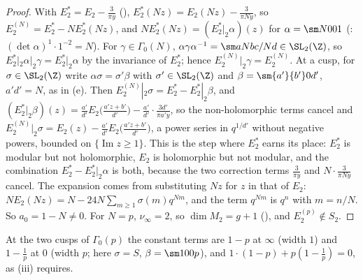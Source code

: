 \begin{proof}
With $E_2^*=E_2-\frac3{\pi y}$ (), $E_2^*(Nz)=E_2(Nz)-\frac3{\pi Ny}$, so $E_2^{(N)}=E_2^*-NE_2^*(Nz)$, and $NE_2^*(Nz)=(E_2^*|_2\alpha)(z)$ for
$\alpha=\sm N001$ (: $(\det\alpha)^{1}\cdot1^{-2}=N$). For $\gamma\in\Gamma_0(N)$, $\alpha\gamma\alpha^{-1}=\sm a{Nb}{c/N}d\in\SL_2(\Z)$, so $E_2^*|_2\alpha|_2\gamma=E_2^*|_2\alpha$ by the
invariance of $E_2^*$; hence $E_2^{(N)}|_2\gamma=E_2^{(N)}$. At a cusp, for $\sigma\in\SL_2(\Z)$ write $\alpha\sigma=\sigma'\beta$ with $\sigma'\in\SL_2(\Z)$ and $\beta=\sm{a'}{b'}0{d'}$, $a'd'=N$, as in
(e). Then $E_2^{(N)}|_2\sigma=E_2^*-E_2^*|_2\beta$, and
$(E_2^*|_2\beta)(z)=\frac{a'}{d'}E_2\bigl(\frac{a'z+b'}{d'}\bigr)-\frac{a'}{d'}\cdot\frac{3d'}{\pi a'y}$, so the non-holomorphic terms cancel and
$E_2^{(N)}|_2\sigma=E_2(z)-\frac{a'}{d'}E_2\bigl(\frac{a'z+b'}{d'}\bigr)$, a power series in $q^{1/d'}$ without negative powers, bounded on $\{\operatorname{Im}z\ge1\}$. This is the step where
$E_2^*$ earns its place: $E_2^*$ is modular but not holomorphic, $E_2$ is holomorphic but not modular, and the combination $E_2^*-E_2^*|_2\alpha$ is both, because the two
correction terms $\frac3{\pi y}$ and $N\cdot\frac3{\pi Ny}$ cancel. The expansion comes from substituting $Nz$ for $z$ in that of $E_2$:
$NE_2(Nz)=N-24N\sum_{m\ge1}\sigma(m)q^{Nm}$, and the term $q^{Nm}$ is $q^n$ with $m=n/N$. So $a_0=1-N\ne0$. For $N=p$, $\nu_\infty=2$, so $\dim M_2=g+1$ (), and $E_2^{(p)}\notin S_2$.
\end{proof}

At the two cusps of $\Gamma_0(p)$ the constant terms are $1-p$ at $\infty$ (width $1$) and $1-\frac1p$ at $0$ (width $p$; here $\sigma=S$, $\beta=\sm100p$), and $1\cdot(1-p)+p(1-\frac1p)=0$,
as (iii) requires.

